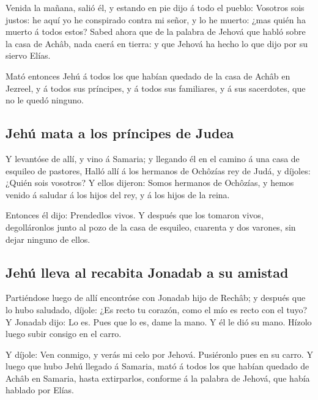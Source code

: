  Venida la mañana, salió él, y estando en pie dijo á todo
el pueblo: Vosotros sois justos: he aquí yo he conspirado contra mi
señor, y lo he muerto: ¿mas quién ha muerto á todos estos?
 Sabed ahora que de la palabra de Jehová que habló sobre
la casa de Achâb, nada caerá en tierra: y que Jehová ha hecho lo que
dijo por su siervo Elías.

 Mató entonces Jehú á todos los que habían quedado de la
casa de Achâb en Jezreel, y á todos sus príncipes, y á todos sus
familiares, y á sus sacerdotes, que no le quedó ninguno.

\hypertarget{jehuxfa-mata-a-los-pruxedncipes-de-judea}{%
\subsection{Jehú mata a los príncipes de
Judea}\label{jehuxfa-mata-a-los-pruxedncipes-de-judea}}

 Y levantóse de allí, y vino á Samaria; y llegando él en
el camino á una casa de esquileo de pastores,  Halló allí
á los hermanos de Ochôzías rey de Judá, y díjoles: ¿Quién sois vosotros?
Y ellos dijeron: Somos hermanos de Ochôzías, y hemos venido á saludar á
los hijos del rey, y á los hijos de la reina.

 Entonces él dijo: Prendedlos vivos. Y después que los
tomaron vivos, degolláronlos junto al pozo de la casa de esquileo,
cuarenta y dos varones, sin dejar ninguno de ellos.

\hypertarget{jehuxfa-lleva-al-recabita-jonadab-a-su-amistad}{%
\subsection{Jehú lleva al recabita Jonadab a su
amistad}\label{jehuxfa-lleva-al-recabita-jonadab-a-su-amistad}}

 Partiéndose luego de allí encontróse con Jonadab hijo de
Rechâb; y después que lo hubo saludado, díjole: ¿Es recto tu corazón,
como el mío es recto con el tuyo? Y Jonadab dijo: Lo es. Pues que lo es,
dame la mano. Y él le dió su mano. Hízolo luego subir consigo en el
carro.

 Y díjole: Ven conmigo, y verás mi celo por Jehová.
Pusiéronlo pues en su carro.  Y luego que hubo Jehú
llegado á Samaria, mató á todos los que habían quedado de Achâb en
Samaria, hasta extirparlos, conforme á la palabra de Jehová, que había
hablado por Elías.

